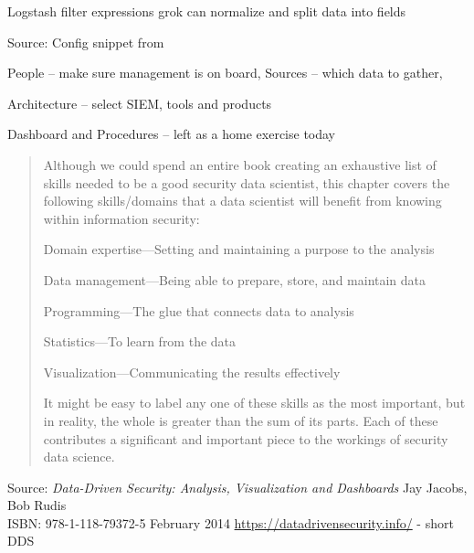 \documentclass[Screen16to9,17pt]{foils}
\begin{document}
\begin{list2}
\item Logstash filter expressions grok can normalize and split data into fields
\end{list2}

Source:
Config snippet from\\
{\small{}}





\begin{list2}
\item People -- make sure management is on board, Sources -- which data to gather,
\item Architecture -- select SIEM, tools and products
\item Dashboard and Procedures -- left as a home exercise today
\end{list2}




\begin{quote}
Although we could spend an entire book creating an exhaustive list of skills needed to be a good security data scientist, this chapter covers the following skills/domains that a data scientist will benefit from
knowing within information security:
\begin{list2}
\item Domain expertise—Setting and maintaining a purpose to the analysis
\item Data management—Being able to prepare, store, and maintain data
\item Programming—The glue that connects data to analysis
\item Statistics—To learn from the data
\item Visualization—Communicating the results effectively
\end{list2}
It might be easy to label any one of these skills as the most important, but in reality, the whole is greater than the sum of its parts. Each of these contributes a significant and important piece to the workings of
security data science.
\end{quote}

Source: \emph{Data-Driven Security: Analysis, Visualization and Dashboards} Jay Jacobs, Bob Rudis\\
ISBN: 978-1-118-79372-5 February 2014 \url{https://datadrivensecurity.info/} - short DDS
\end{document}
